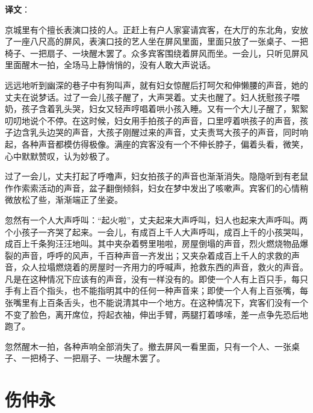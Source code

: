 \documentclass[12pt,UTF-8,openany]{ctexbook}
\begin{document}
\textbf{译文}：

\vspace{1em}

\begin{normalsize}
    
    京城里有个擅长表演口技的人。正赶上有户人家宴请宾客，在大厅的东北角，安放了一座八尺高的屏风，表演口技的艺人坐在屏风里面，里面只放了一张桌子、一把椅子、一把扇子、一块醒木罢了。众多宾客围绕着屏风而坐。一会儿，只听见屏风里面醒木一拍，全场马上静悄悄的，没有人敢大声说话。
    
    远远地听到幽深的巷子中有狗叫声，就有妇女惊醒后打呵欠和伸懒腰的声音，她的丈夫在说梦话。过了一会儿孩子醒了，大声哭着。丈夫也醒了。妇人抚慰孩子喂奶，孩子含着乳头哭，妇女又轻声哼唱着哄小孩入睡。又有一个大儿子醒了，絮絮叨叨地说个不停。在这时候，妇女用手拍孩子的声音，口里哼着哄孩子的声音，孩子边含乳头边哭的声音，大孩子刚醒过来的声音，丈夫责骂大孩子的声音，同时响起，各种声音都模仿得极像。满座的宾客没有一个不伸长脖子，偏着头看，微笑，心中默默赞叹，认为妙极了。
    
    过了一会儿，丈夫打起了呼噜声，妇女拍孩子的声音也渐渐消失。隐隐听到有老鼠作作索索活动的声音，盆子翻倒倾斜，妇女在梦中发出了咳嗽声。宾客们的心情稍微放松了些，渐渐端正了坐姿。
    
    忽然有一个人大声呼叫：“起火啦”，丈夫起来大声呼叫，妇人也起来大声呼叫。两个小孩子一齐哭了起来。一会儿，有成百上千人大声呼叫，成百上千的小孩哭叫，成百上千条狗汪汪地叫。其中夹杂着劈里啪啦，房屋倒塌的声音，烈火燃烧物品爆裂的声音，呼呼的风声，千百种声音一齐发出；又夹杂着成百上千人的求救的声音，众人拉塌燃烧着的房屋时一齐用力的呼喊声，抢救东西的声音，救火的声音。凡是在这种情况下应该有的声音，没有一样没有的。即使一个人有上百只手，每只手有上百个指头，也不能指明其中的任何一种声音来；即使一个人有上百张嘴，每张嘴里有上百条舌头，也不能说清其中一个地方。在这种情况下，宾客们没有一个不变了脸色，离开席位，捋起衣袖，伸出手臂，两腿打着哆嗦，差一点争先恐后地跑了。
    
    忽然醒木一拍，各种声响全部消失了。撤去屏风一看里面，只有一个人、一张桌子、一把椅子、一把扇子、一块醒木罢了。
    
\end{normalsize}



\chapter{伤仲永}
\end{document}
